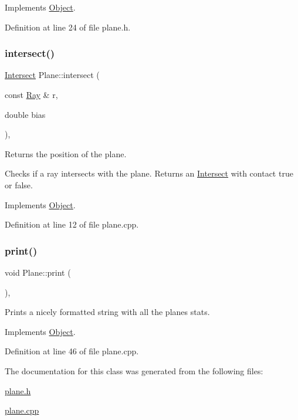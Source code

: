 Implements \mbox{\hyperlink{class_object_a71cb3da0e19b83f2558bf406abc9db68}{Object}}.



Definition at line 24 of file plane.\+h.

\mbox{\label{class_plane_ab636b2a91165088ba60dac02aaf89785}} 
\subsubsection{\texorpdfstring{intersect()}{intersect()}}
{\footnotesize\ttfamily \mbox{\hyperlink{struct_intersect}{Intersect}} Plane\+::intersect (\begin{DoxyParamCaption}\item[{const \mbox{\hyperlink{struct_ray}{Ray}} \&}]{r,  }\item[{double}]{bias }\end{DoxyParamCaption})\hspace{0.3cm}{\ttfamily [override]}, {\ttfamily [virtual]}}



Returns the position of the plane. 

Checks if a ray intersects with the plane. Returns an \mbox{\hyperlink{struct_intersect}{Intersect}} with contact true or false. 

Implements \mbox{\hyperlink{class_object_a16d022cf54624baea89c542a44e6db26}{Object}}.



Definition at line 12 of file plane.\+cpp.

\mbox{\label{class_plane_a3d9139793b931279e3dcd1fd80a263c7}} 
\subsubsection{\texorpdfstring{print()}{print()}}
{\footnotesize\ttfamily void Plane\+::print (\begin{DoxyParamCaption}{ }\end{DoxyParamCaption})\hspace{0.3cm}{\ttfamily [override]}, {\ttfamily [virtual]}}



Prints a nicely formatted string with all the plane\textquotesingle{}s stats. 



Implements \mbox{\hyperlink{class_object_ad81452e5a38455eff025d85ef1da7307}{Object}}.



Definition at line 46 of file plane.\+cpp.



The documentation for this class was generated from the following files\+:\begin{DoxyCompactItemize}
\item 
\mbox{\hyperlink{plane_8h}{plane.\+h}}\item 
\mbox{\hyperlink{plane_8cpp}{plane.\+cpp}}\end{DoxyCompactItemize}
